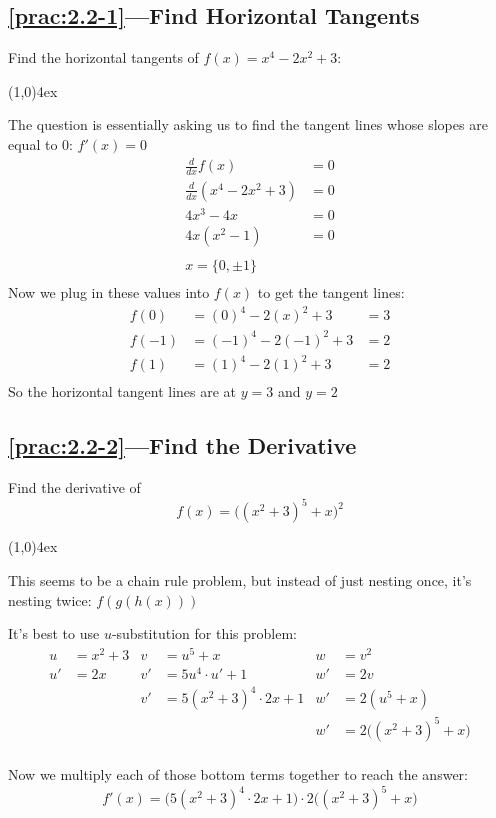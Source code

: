 \documentclass{MathNotes}
\newcommand{\br}{
\begin{center}
\line(1,0){4ex}
\end{center}}
\begin{document}
\subsection*{\ref{prac:2.2-1}---Find Horizontal Tangents}\label{ans:2.2-1}
Find the horizontal tangents of $f(x)=x^4-2x^2+3$:
\br
The question is essentially asking us to find the tangent lines whose
slopes are equal to 0: $f'(x)=0$
\begin{align*}
    \frac{d}{dx}f(x)&=0\\
    \frac{d}{dx}(x^4-2x^2+3)&=0\\
    4x^3-4x &=0\\
    4x(x^2-1)&=0\\
    \\
    x=\{0, \pm 1\}\\
\end{align*}
Now we plug in these values into $f(x)$ to get the tangent lines:
\begin{align*}
    f(0)&=(0)^4-2(x)^2+3&=3\\
    f(-1)&=(-1)^4-2(-1)^2+3&=2\\
    f(1)&=(1)^4-2(1)^2+3&=2\\
\end{align*}
So the horizontal tangent lines are at $y=3$ and $y=2$

\subsection*{\ref{prac:2.2-2}---Find the Derivative}\label{ans:2.2-2}
Find the derivative of $$f(x)=\big((x^2+3)^5+x\big)^2$$
\br
This seems to be a chain rule problem, but instead of just nesting once,
it's nesting twice: $f(g(h(x)))$

It's best to use $u$-substitution for this problem:
\begin{align*}
    u&=x^2+3 & v&=u^5+x & w&=v^2\\
    u'&=2x & v'&=5u^4\cdot u'+1 & w'&=2v\\
     && v'&=5(x^2+3)^4\cdot 2x+1 & w'&=2(u^5+x)\\
     && && w'&=2\big((x^2+3)^5+x\big)\\
\end{align*}

Now we multiply each of those bottom terms together to reach the answer:
$$f'(x)=\big(5(x^2+3)^4\cdot 2x+1\big)\cdot2\big((x^2+3)^5+x\big)$$

\newpage
\end{document}
